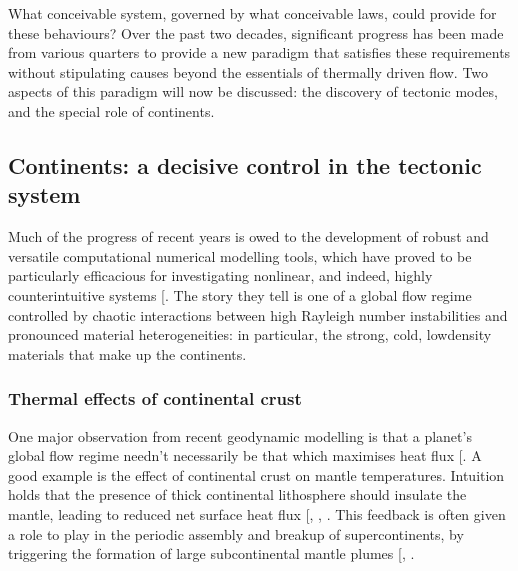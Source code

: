 \documentclass[letterpaper,10pt,english]{jupyterBook}
\begin{document}
\sphinxAtStartPar
What conceivable system, governed by what conceivable laws, could provide for these behaviours? Over the past two decades, significant progress has been made from various quarters to provide a new paradigm that satisfies these requirements without stipulating causes beyond the essentials of thermally driven flow. Two aspects of this paradigm will now be discussed: the discovery of tectonic modes, and the special role of continents.


\subsection{Continents: a decisive control in the tectonic system}
\label{\detokenize{content/chapter_01_background/main:continents-a-decisive-control-in-the-tectonic-system}}
\sphinxAtStartPar
Much of the progress of recent years is owed to the development of robust and versatile computational numerical modelling tools, which have proved to be particularly efficacious for investigating non\sphinxhyphen{}linear, and indeed, highly counter\sphinxhyphen{}intuitive systems {[}\sphinxcite{references:id383}{]}. The story they tell is one of a global flow regime controlled by chaotic interactions between high Rayleigh number instabilities and pronounced material heterogeneities: in particular, the strong, cold, low\sphinxhyphen{}density materials that make up the continents.


\subsubsection{Thermal effects of continental crust}
\label{\detokenize{content/chapter_01_background/main:thermal-effects-of-continental-crust}}
\sphinxAtStartPar
One major observation from recent geodynamic modelling is that a planet’s global flow regime needn’t necessarily be that which maximises heat flux {[}\sphinxcite{references:id459}{]}. A good example is the effect of continental crust on mantle temperatures. Intuition holds that the presence of thick continental lithosphere should insulate the mantle, leading to reduced net surface heat flux {[}, , \sphinxcite{references:id292}{]}. This feedback is often given a role to play in the periodic assembly and breakup of supercontinents, by triggering the formation of large sub\sphinxhyphen{}continental mantle plumes {[}, \sphinxcite{references:id256}{]}.
\end{document}
